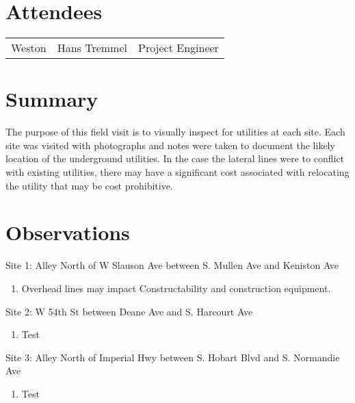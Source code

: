 \documentclass{article}
\newenvironment{pres}[2]{%
  \large{#2}
  \smallskip
}
{
  \goodbreak
  \smallskip
}
\begin{document}
\section*{Attendees}
\begin{table}[h]
  \label{tab:label}
  \begin{tabular}{l l l}
    Weston & Hans Tremmel & Project Engineer \\
  \end{tabular}
\end{table}

\section*{Summary}
The purpose of this field visit is to visually inspect for utilities at each site.  Each site was visited with photographs and notes were taken to document the likely location of the underground utilities.  In the case the lateral lines were to conflict with existing utilities, there may have a significant cost associated with relocating the utility that may be cost prohibitive.

\section*{Observations}
\begin{pres}{}{Site 1: Alley North of W Slauson Ave between S. Mullen Ave and Keniston Ave}
  \begin{enumerate}[noitemsep]
      \item Overhead lines may impact Constructability and construction equipment.
  \end{enumerate}

\end{pres}

\begin{pres}{}{Site 2: W 54th St between Deane Ave and S. Harcourt Ave}
  \begin{enumerate}[noitemsep]
      \item Test
  \end{enumerate}

\end{pres}

\begin{pres}{}{Site 3: Alley North of Imperial Hwy between S. Hobart Blvd and S. Normandie Ave}
  \begin{enumerate}[noitemsep]
      \item Test
  \end{enumerate}
\end{pres}
\end{document}
